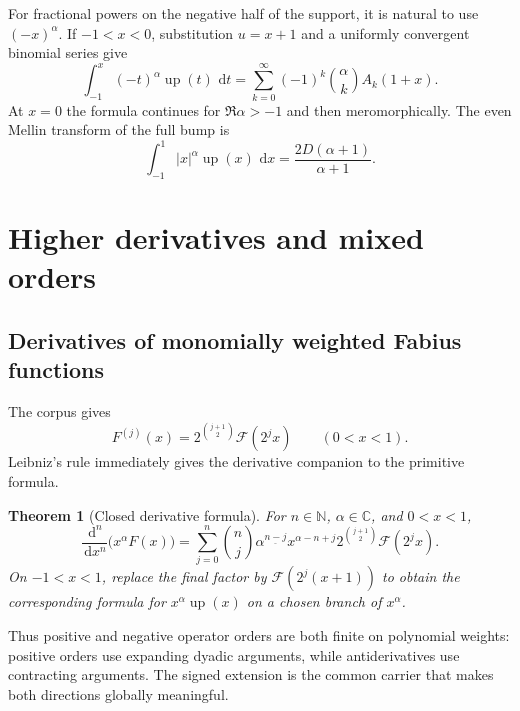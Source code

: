 \documentclass[11pt,oneside]{article}
\newtheorem{theorem}{Theorem}[section]
\theoremstyle{definition}
\theoremstyle{remark}
\newcommand{\Up}{\operatorname{up}}
\newcommand{\C}{\mathbb C}
\newcommand{\N}{\mathbb N}
\newcommand{\dd}{\,\mathrm d}
\newcommand{\fall}[2]{#1^{\underline{#2}}}
\newcommand{\1}{\mathbf 1}
\begin{document}
For fractional powers on the negative half of the support, it is natural to use $(-x)^\alpha$.
If $-1<x<0$, substitution $u=x+1$ and a uniformly convergent binomial series give
\begin{equation}
 \boxed{
 \int_{-1}^{x}(-t)^\alpha\Up(t)\,\dd t
 =\sum_{k=0}^{\infty}(-1)^k\binom\alpha k A_k(1+x).}
 \label{p3:eq:up-negative-half-fractional}
\end{equation}
At $x=0$ the formula continues for $\Re\alpha>-1$ and then meromorphically.  The even Mellin
transform of the full bump is
\begin{equation}
 \int_{-1}^1|x|^\alpha\Up(x)\,\dd x
 =\frac{2D(\alpha+1)}{\alpha+1}.                             \label{p3:eq:up-even-Mellin}
\end{equation}

\section{Higher derivatives and mixed orders}
\label{p3:sec:derivatives}

\subsection{Derivatives of monomially weighted Fabius functions}

The corpus gives
\begin{equation}
 F^{(j)}(x)=2^{\binom{j+1}{2}}\mathcal F(2^jx)\qquad(0<x<1).
 \label{p3:eq:F-derivative-ladder}
\end{equation}
Leibniz's rule immediately gives the derivative companion to the primitive formula.

\begin{theorem}[Closed derivative formula]
\label{p3:thm:weighted-derivative}
For $n\in\N$, $\alpha\in\C$, and $0<x<1$,
\begin{equation}
 \boxed{
 \frac{\dd^n}{\dd x^n}\bigl(x^\alpha F(x)\bigr)
 =\sum_{j=0}^{n}\binom nj\fall\alpha{n-j}
 x^{\alpha-n+j}2^{\binom{j+1}{2}}\mathcal F(2^jx).}
 \label{p3:eq:weighted-derivative}
\end{equation}
On $-1<x<1$, replace the final factor by
$\mathcal F(2^j(x+1))$ to obtain the corresponding formula for $x^\alpha\Up(x)$ on a chosen
branch of $x^\alpha$.
\end{theorem}

Thus positive and negative operator orders are both finite on polynomial weights: positive
orders use expanding dyadic arguments, while antiderivatives use contracting arguments.  The
signed extension is the common carrier that makes both directions globally meaningful.
\end{document}
